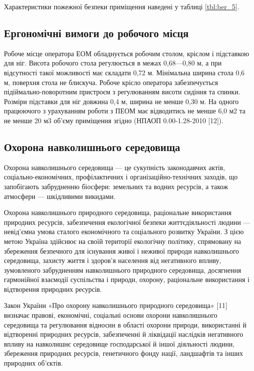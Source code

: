 Характеристики пожежної безпеки приміщення наведені у таблиці \ref{tbl:ber_5}.

%

\subsection{Ергономічні вимоги до робочого місця}
Робоче місце оператора ЕОМ обладнується робочим столом, кріслом і підставкою для ніг. Висота робочого стола регулюється в межах 0,68—0,80 м, а при відсутності такої можливості має складати 0,72 м. Мінімальна ширина стола 0,6 м, поверхня стола не блискуча. Робоче крісло оператора забезпечується підіймально-поворотним пристроєм з регулюванням висоти сидіння та спинки. Розміри підставки для ніг довжина 0,4 м, ширина не менше 0,30 м.  На одного працюючого з урахуванням роботи з ПЕОМ має відводитись не менше 6,0 м2 та не менше 20 м3 об’єму приміщення згідно (НПАОП 0.00-1.28-2010 [12]).

\subsection{Охорона навколишнього середовища}
Охорона навколишнього середовища --- це сукупність законодавчих актів, соціально-економічних, профілактичних і організаційно-технічних заходів, що запобігають забрудненню біосфери: земельних та водних ресурсів, а також атмосфери --- шкідливими викидами.

Охорона навколишнього природного середовища, раціональне використання природних ресурсів, забезпечення екологічної безпеки життєдіяльності людини --- невід'ємна умова сталого економічного та соціального розвитку України. З цією метою Україна здійснює на своїй території екологічну політику, спрямовану на збереження безпечного для існування живої і неживої природи навколишнього середовища, захисту життя і здоров'я населення від негативного впливу, зумовленого забрудненням навколишнього природного середовища, досягнення гармонійної взаємодії суспільства і природи, охорону, раціональне використання і відтворення природних ресурсів.

Закон України «Про охорону навколишнього природного середовища» [11] визначає правові, економічні, соціальні основи охорони навколишнього середовища та регулювання відносин в області охорони природи, використанні й відтворенні природних ресурсів, забезпеченні й ліквідації наслідків негативного впливу на навколишнє середовище господарської й іншої діяльності людини, збереження природних ресурсів, генетичного фонду нації, ландшафтів та інших природних об’єктів.

